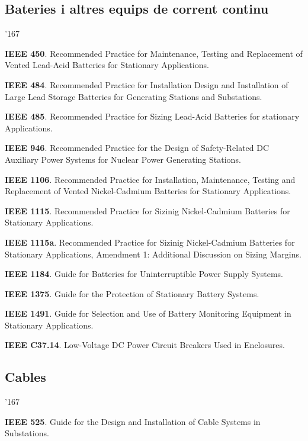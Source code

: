 \subsection*{Bateries i altres equips de corrent continu}
\begin{dinglist}{'167}
    \item \textbf{IEEE 450}. Recommended Practice for  Maintenance, Testing and Replacement of Vented Lead-Acid Batteries for Stationary Applications.
    \item \textbf{IEEE 484}. Recommended Practice for Installation Design and Installation of Large Lead Storage Batteries for Generating Stations and Substations.
    \item \textbf{IEEE 485}. Recommended Practice for Sizing Lead-Acid Batteries for stationary Applications.
    \item \textbf{IEEE 946}. Recommended Practice for the Design of Safety-Related DC Auxiliary Power Systems for Nuclear Power Generating Stations.
    \item \textbf{IEEE 1106}. Recommended Practice for Installation, Maintenance, Testing and Replacement of Vented Nickel-Cadmium Batteries for Stationary Applications.
    \item \textbf{IEEE 1115}. Recommended Practice for Sizinig Nickel-Cadmium Batteries for Stationary Applications.
    \item \textbf{IEEE 1115a}. Recommended Practice for Sizinig Nickel-Cadmium Batteries for Stationary Applications, Amendment 1: Additional Discussion on Sizing Margins.
    \item \textbf{IEEE 1184}. Guide for Batteries for Uninterruptible Power Supply Systems.
    \item \textbf{IEEE 1375}. Guide for the Protection of Stationary Battery Systems.
    \item \textbf{IEEE 1491}. Guide for Selection and Use of Battery Monitoring Equipment in Stationary Applications.
    \item \textbf{IEEE C37.14}. Low-Voltage DC Power Circuit Breakers Used in Enclosures.
\end{dinglist}


\subsection*{Cables}
\begin{dinglist}{'167}
    \item \textbf{IEEE 525}. Guide for the Design and Installation of Cable Systems in Substations.
\end{dinglist}

